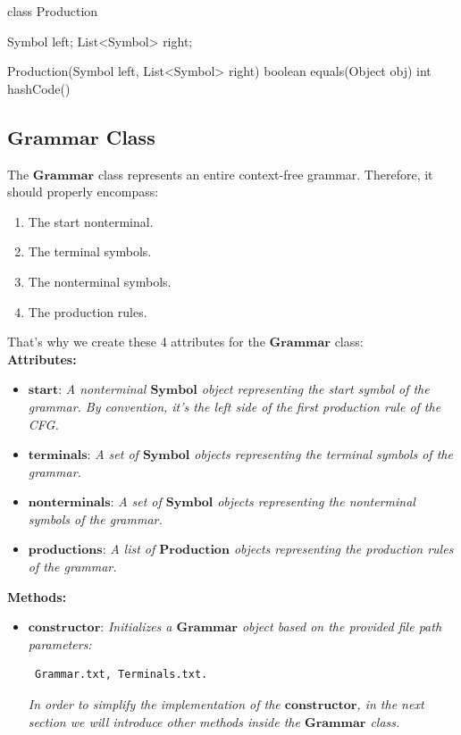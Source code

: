 \begin{codeblock}
    class Production {
        Symbol left;
        List<Symbol> right;

        Production(Symbol left, List<Symbol> right) {}
        boolean equals(Object obj) {}
        int hashCode() {}
    }
\end{codeblock}

\vspace{10pt}

\subsection{\(\boldsymbol{Grammar}\) Class}

The \(\boldsymbol{Grammar}\) class represents an entire context-free grammar. Therefore, it should properly encompass:

\begin{enumerate}
    \item The start nonterminal.
    \item The terminal symbols.
    \item The nonterminal symbols.
    \item The production rules.
\end{enumerate}

That’s why we create these 4 attributes for the \(\boldsymbol{Grammar}\) class:\\

\textbf{Attributes:}
\begin{itemize}
    \item \(\boldsymbol{start}\): \textit{A nonterminal \(\boldsymbol{Symbol}\) object representing the start symbol of the grammar. By convention, it’s the left side of the first production rule of the CFG.}
    \item \(\boldsymbol{terminals}\): \textit{A set of \(\boldsymbol{Symbol}\) objects representing the terminal symbols of the grammar.}
    \item \(\boldsymbol{nonterminals}\): \textit{A set of \(\boldsymbol{Symbol}\) objects representing the nonterminal symbols of the grammar.}
    \item \(\boldsymbol{productions}\): \textit{A list of \(\boldsymbol{Production}\) objects representing the production rules of the grammar.}
\end{itemize}

\textbf{Methods:}
\begin{itemize}
    \item \(\boldsymbol{constructor}\): \textit{Initializes a \(\boldsymbol{Grammar}\) object based on the provided file path parameters:}
    \begin{verbatim} Grammar.txt, Terminals.txt.\end{verbatim}
    \textit{In order to simplify the implementation of the \(\boldsymbol{constructor}\), in the next section we will introduce other methods inside the \(\boldsymbol{Grammar}\) class.}
\end{itemize}


